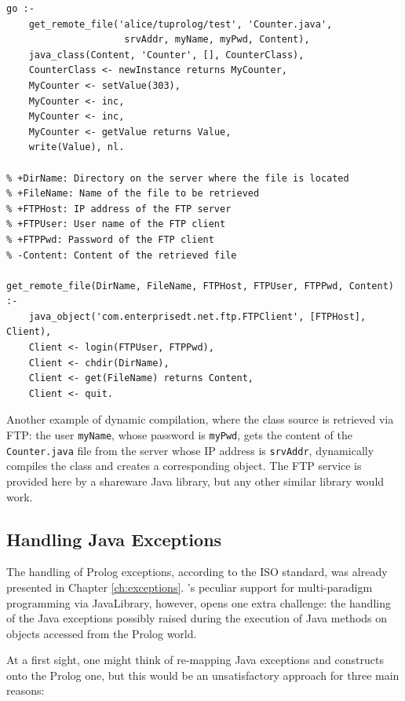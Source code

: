 \begin{table}
{\small
\begin{verbatim}
go :-
    get_remote_file('alice/tuprolog/test', 'Counter.java',
                     srvAddr, myName, myPwd, Content),
    java_class(Content, 'Counter', [], CounterClass),
    CounterClass <- newInstance returns MyCounter,
    MyCounter <- setValue(303),
    MyCounter <- inc,
    MyCounter <- inc,
    MyCounter <- getValue returns Value,
    write(Value), nl.

% +DirName: Directory on the server where the file is located
% +FileName: Name of the file to be retrieved
% +FTPHost: IP address of the FTP server
% +FTPUser: User name of the FTP client
% +FTPPwd: Password of the FTP client
% -Content: Content of the retrieved file

get_remote_file(DirName, FileName, FTPHost, FTPUser, FTPPwd, Content) :-
    java_object('com.enterprisedt.net.ftp.FTPClient', [FTPHost], Client),
    Client <- login(FTPUser, FTPPwd),
    Client <- chdir(DirName),
    Client <- get(FileName) returns Content,
    Client <- quit.
\end{verbatim}
}
\caption{Another example of dynamic compilation, where the class source is retrieved via FTP: the user \texttt{myName}, whose password is \texttt{myPwd}, gets the content of the \texttt{Counter.java} file from the server whose IP address is \texttt{srvAddr}, dynamically compiles the class and creates a corresponding object. The FTP service is provided here by a shareware Java library, but any other similar library would work.}
\label{tab:dynamic-compilation-via-FTP}
\end{table}

\subsection{Handling Java Exceptions}
\label{ssec:java-exceptions-in-tuprolog}

The handling of Prolog exceptions, according to the ISO standard, was already presented in Chapter \ref{ch:exceptions}.
%
\tuprolog{}'s peculiar support for multi-paradigm programming via JavaLibrary, however, opens one extra challenge: the handling of the Java exceptions possibly raised during the execution of Java methods on objects accessed from the Prolog world.

At a first sight, one might think of re-mapping Java exceptions and constructs onto the Prolog one, but this would be an unsatisfactory approach for three main reasons:

